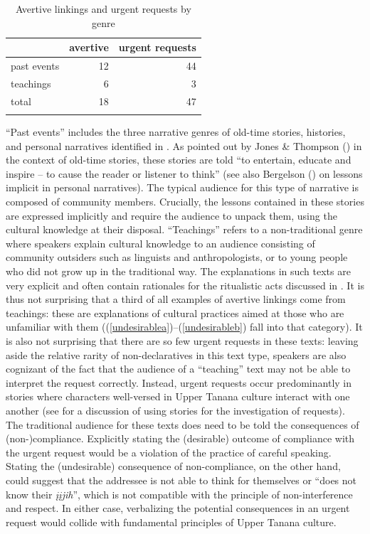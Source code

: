 \documentclass[output=paper,colorlinks,citecolor=brown]{langscibook}
\begin{document}
\begin{table}
\caption{Avertive linkings and urgent requests by genre}
\label{tab:avertive-freq2}
 \begin{tabular}{l rr } 
  \lsptoprule
      & avertive & urgent requests  \\   \midrule
past events & 12 & 44 \\
teachings & 6 & 3 \\\midrule
total & 18 & 47\\ 
  \lspbottomrule
 \end{tabular}
\end{table} 

``Past events'' includes the three narrative genres of old-time stories, histories, and personal narratives identified in \citet{LovickO2012b-genre}.  As pointed out by Jones \& Thompson (\citeyear[ix]{JonesEThompsonC1990}) in the context of old-time stories, these stories are told ``to entertain, educate and inspire -- to cause the reader or listener to think'' (see also Bergelson (\citeyear{BergelsonM2019}) on lessons implicit in personal narratives). The typical audience for this type of narrative is composed of community members. Crucially, the lessons contained in these stories are expressed implicitly and require the audience to unpack them, using the cultural knowledge at their disposal. ``Teachings'' refers to a non-traditional genre where speakers explain cultural knowledge to an audience consisting of community outsiders such as linguists and anthropologists, or to young people who did not grow up in the traditional way. The explanations in such texts are very explicit and often contain rationales for the ritualistic acts discussed in . It is thus not surprising that a third of all examples of avertive linkings come from teachings: these are explanations of cultural practices aimed at those who are unfamiliar with them ((\ref{undesirablea})--(\ref{undesirableb}) fall into that category). It is also not surprising that there are so few urgent requests in these texts: leaving aside the relative rarity of non-declaratives in this text type, speakers are also cognizant of the fact that the audience of a ``teaching'' text may not be able to interpret the request correctly. Instead, urgent requests occur predominantly in stories where characters well-versed in Upper Tanana culture interact with one another (see \citet{LovickO2016} for a discussion of using stories for the investigation of requests). The traditional audience for these texts does need to be told the consequences of (non-)compliance. Explicitly stating the (desirable) outcome of compliance with the urgent request would be a violation of the practice of careful speaking. Stating the (undesirable) consequence of non-compliance, on the other hand, could suggest that the addressee is not able to think for themselves or ``does not know their \textit{įįjih}'', which is not compatible with the principle of non-interference and respect. In either case, verbalizing the potential consequences in an urgent request would collide with fundamental principles of Upper Tanana culture.
\end{document}
